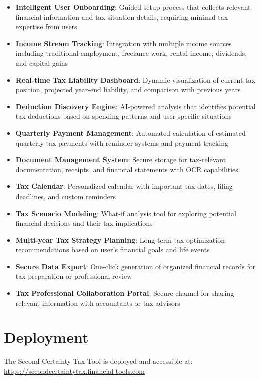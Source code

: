 \documentclass[
  11pt,
  letterpaper,
]{article}
\providecommand{\tightlist}{%
  \setlength{\itemsep}{0pt}\setlength{\parskip}{0pt}}\usepackage{longtable,booktabs,array}
\begin{document}
\begin{itemize}
\tightlist
\item
  \textbf{Intelligent User Onboarding}: Guided setup process that
  collects relevant financial information and tax situation details,
  requiring minimal tax expertise from users
\item
  \textbf{Income Stream Tracking}: Integration with multiple income
  sources including traditional employment, freelance work, rental
  income, dividends, and capital gains
\item
  \textbf{Real-time Tax Liability Dashboard}: Dynamic visualization of
  current tax position, projected year-end liability, and comparison
  with previous years
\item
  \textbf{Deduction Discovery Engine}: AI-powered analysis that
  identifies potential tax deductions based on spending patterns and
  user-specific situations
\item
  \textbf{Quarterly Payment Management}: Automated calculation of
  estimated quarterly tax payments with reminder systems and payment
  tracking
\item
  \textbf{Document Management System}: Secure storage for tax-relevant
  documentation, receipts, and financial statements with OCR
  capabilities
\item
  \textbf{Tax Calendar}: Personalized calendar with important tax dates,
  filing deadlines, and custom reminders
\item
  \textbf{Tax Scenario Modeling}: What-if analysis tool for exploring
  potential financial decisions and their tax implications
\item
  \textbf{Multi-year Tax Strategy Planning}: Long-term tax optimization
  recommendations based on user's financial goals and life events
\item
  \textbf{Secure Data Export}: One-click generation of organized
  financial records for tax preparation or professional review
\item
  \textbf{Tax Professional Collaboration Portal}: Secure channel for
  sharing relevant information with accountants or tax advisors
\end{itemize}

\hypertarget{deployment}{%
\section{Deployment}\label{deployment}}

The Second Certainty Tax Tool is deployed and accessible at:
\url{https://secondcertaintytax.financial-tools.com}
\end{document}
